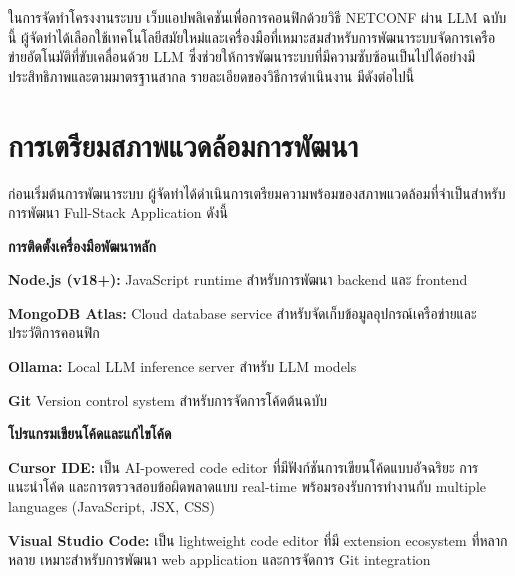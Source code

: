 
\hspace*{1.3em} %
ในการจัดทำโครงงานระบบ เว็บแอปพลิเคชันเพื่อการคอนฟิกด้วยวิธี NETCONF ผ่าน LLM  ฉบับนี้ ผู้จัดทำได้เลือกใช้เทคโนโลยีสมัยใหม่และเครื่องมือที่เหมาะสมสำหรับการพัฒนาระบบจัดการเครือข่ายอัตโนมัติที่ขับเคลื่อนด้วย LLM ซึ่งช่วยให้การพัฒนาระบบที่มีความซับซ้อนเป็นไปได้อย่างมีประสิทธิภาพและตามมาตรฐานสากล รายละเอียดของวิธีการดำเนินงาน มีดังต่อไปนี้
\section{การเตรียมสภาพแวดล้อมการพัฒนา}

\hspace*{1.3em} %
ก่อนเริ่มต้นการพัฒนาระบบ ผู้จัดทำได้ดำเนินการเตรียมความพร้อมของสภาพแวดล้อมที่จำเป็นสำหรับการพัฒนา Full-Stack Application ดังนี้

\begin{mycustomenum2}
    \item \textbf{การติดตั้งเครื่องมือพัฒนาหลัก}
    \begin{mycustomenum2}
        \item \textbf{Node.js (v18+):} JavaScript runtime สำหรับการพัฒนา backend และ frontend
        \item \textbf{MongoDB Atlas:} Cloud database service สำหรับจัดเก็บข้อมูลอุปกรณ์เครือข่ายและประวัติการคอนฟิก
        \item \textbf{Ollama:} Local LLM inference server สำหรับ LLM models
        \item \textbf{Git} Version control system สำหรับการจัดการโค้ดต้นฉบับ
    \end{mycustomenum2}
    \item \textbf{โปรแกรมเขียนโค้ดและแก้ไขโค้ด}
    \begin{mycustomenum2}
        \item \textbf{Cursor IDE:} เป็น AI-powered code editor ที่มีฟังก์ชันการเขียนโค้ดแบบอัจฉริยะ การแนะนำโค้ด และการตรวจสอบข้อผิดพลาดแบบ real-time พร้อมรองรับการทำงานกับ multiple languages (JavaScript, JSX, CSS)
        \item \textbf{Visual Studio Code:} เป็น lightweight code editor ที่มี extension ecosystem ที่หลากหลาย เหมาะสำหรับการพัฒนา web application และการจัดการ Git integration
    \end{mycustomenum2}
\end{mycustomenum2}

